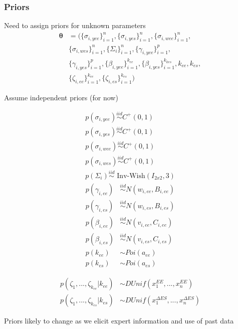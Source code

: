\documentclass[handout]{beamer}\usepackage[]{graphicx}\usepackage[]{color}
\begin{document}
\begin{frame}
\frametitle{Priors}
Need to assign priors for unknown parameters 
\begin{align}
\boldsymbol{\theta} &= (\{\sigma_{i,yee} \}_{i=1}^{n}, \{\sigma_{i,yes}\}_{i=1}^{n} , \{\sigma_{i,wee}\}_{i=1}^{n} , \\
& \{\sigma_{i,wes}\}_{i=1}^{n} ,\{\Sigma_{i}\}_{i=1}^{n} , \{\gamma_{i,yee}\}_{i=1}^{p} , \\
& \{\gamma_{i,yes}\}_{i=1}^{p} , \{\beta_{i,yee}\}_{i=1}^{k_{ee}} , \{\beta_{i,yes}\}_{i=1}^{k_{kes}}, k_{ee}, k_{es}, \\
& \{\zeta_{i,ee} \}_{i=1}^{k_{ee}},\{\zeta_{i,es} \}_{i=1}^{k_{es}})
\end{align}

\end{frame}

\begin{frame}
Assume independent priors (for now)

\begin{multicols}{2}
\begin{align}
p(\sigma_{i,yee}) \overset{iid}{\sim} C^+(0,1) \\
p(\sigma_{i,yes}) \overset{iid}{\sim} C^+(0,1) \\
p(\sigma_{i,wee}) \overset{iid}{\sim} C^+(0,1) \\
p(\sigma_{i,wes}) \overset{iid}{\sim} C^+(0,1) \\
p(\Sigma_i) \overset{iid}{\sim} \text{ Inv-Wish}(I_{2x2},3) 
\end{align}
\columnbreak
\begin{align}
p(\gamma_{i,ee}) &\overset{iid}{\sim} N(w_{i,ee},B_{i,ee}) \\
p(\gamma_{i,es}) &\overset{iid}{\sim} N(w_{i,es},B_{i,es}) \\
p(\beta_{i,ee}) &\overset{iid}{\sim} N(v_{i,ee},C_{i,ee}) \\
p(\beta_{i,es}) &\overset{iid}{\sim} N(v_{i,es},C_{i,es}) \\
p(k_{ee}) &{\sim} Poi(a_{ee}) \\
p(k_{es}) &{\sim} Poi(a_{es}) 
\end{align}
\end{multicols}
\begin{align}
p(\zeta_1,...,\zeta_{k_{ee}}|k_{ee}) &\sim DUnif(x_1^{EE},...,x_n^{EE}) \\
p(\zeta_1,...,\zeta_{k_{es}}|k_{es}) &\sim DUnif(x_1^{\Delta ES},...,x_n^{\Delta ES})
\end{align}

Priors likely to change as we elicit expert information and use of past data

\end{frame}
\end{document}
